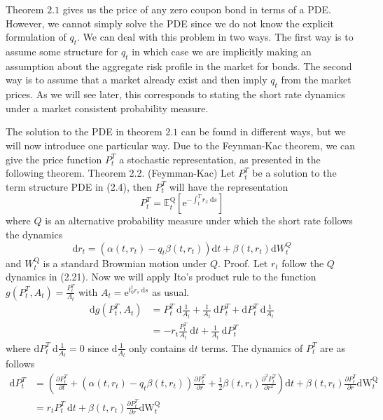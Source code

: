\documentclass[12pt,twoside]{reedthesis}
\begin{document}
Theorem \(2.1\) gives us the price of any zero coupon bond in terms of a PDE. However, we cannot simply solve the PDE since we do not know the explicit formulation of \(q_{t}\). We can deal with this problem in two ways. The first way is to assume some structure for \(q_{t}\) in which case we are implicitly making an assumption about the aggregate risk profile in the market for bonds. The second way is to assume that a market already exist and then imply \(q_{t}\) from the market prices. As we will see later, this corresponds to stating the short rate dynamics under a market consistent probability measure.

The solution to the PDE in theorem \(2.1\) can be found in different ways, but we will now introduce one particular way. Due to the Feynman-Kac theorem, we can give the price function \(P_{t}^{T}\) a stochastic representation, as presented in the following theorem.
Theorem 2.2. (Feymman-Kac) Let \(P_{t}^{T}\) be a solution to the term structure PDE in (2.4), then \(P_{t}^{T}\) will have the representation
\[
P_{t}^{T}=\mathbb{E}_{t}^{\mathrm{Q}}\left[\mathrm{e}^{-\int_{t}^{T} r_{x} \mathrm{~d} s}\right]
\]
where \(Q\) is an alternative probability measure under which the short rate follows the dynamics
\[
\mathrm{d} r_{t}=\left(\alpha\left(t, r_{t}\right)-q_{t} \beta\left(t, r_{t}\right)\right) \mathrm{d} t+\beta\left(t, r_{t}\right) \mathrm{d} W_{t}^{Q}
\]
and \(W_{t}^{\mathrm{Q}}\) is a standard Browmian motion under \(Q\).
Proof. Let \(r_{t}\) follow the \(Q\) dynamics in (2.21). Now we will apply Ito's product rule to the function \(g\left(P_{t}^{T}, A_{t}\right)=\frac{P_{t}^{T}}{A_{t}}\) with \(A_{t}=\mathrm{e}^{t_{0}^{t} r_{s} \mathrm{~d} s}\) as usual.
\[
\begin{aligned}
\mathrm{d} g\left(P_{t}^{T}, A_{t}\right) &=P_{t}^{T} \mathrm{~d} \frac{1}{A_{t}}+\frac{1}{A_{t}} \mathrm{~d} P_{t}^{T}+\mathrm{d} P_{t}^{T} \mathrm{~d} \frac{1}{A_{t}} \\
&=-r_{\mathrm{t}} \frac{P_{t}^{T}}{A_{t}} \mathrm{~d} t+\frac{1}{A_{t}} \mathrm{~d} P_{t}^{T}
\end{aligned}
\]
where \(\mathrm{d} P_{t}^{T} \mathrm{~d} \frac{1}{A_{t}}=0\) since \(\mathrm{d} \frac{1}{A_{l}}\) only contains \(\mathrm{d} t\) terms. The dynamics of \(P_{t}^{T}\) are as follows
\[
\begin{aligned}
\mathrm{d} P_{t}^{T} &=\left(\frac{\partial P_{t}^{T}}{\partial t}+\left(\alpha\left(t, r_{t}\right)-q_{t} \beta\left(t, r_{t}\right)\right) \frac{\partial P_{t}^{T}}{\partial r}+\frac{1}{2} \beta\left(t, r_{t}\right) \frac{\partial^{2} P_{t}^{T}}{\partial r^{2}}\right) \mathrm{d} t+\beta\left(t, r_{t}\right) \frac{\partial P_{t}^{T}}{\partial r} \mathrm{dW}_{t}^{\mathrm{Q}} \\
&=r_{t} P_{t}^{T} \mathrm{~d} t+\beta\left(t, r_{t}\right) \frac{\partial P_{t}^{T}}{\partial r} \mathrm{dW}_{t}^{\mathrm{Q}}
\end{aligned}
\]
\end{document}
